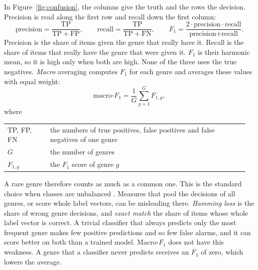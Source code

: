 In Figure~\ref{fig:confusion}, the columns give the truth and the rows the decision. Precision is read along the first row and recall down the first column:
\begin{equation}
  \text{precision} = \frac{\mathrm{TP}}{\mathrm{TP} + \mathrm{FP}}, \qquad
  \text{recall} = \frac{\mathrm{TP}}{\mathrm{TP} + \mathrm{FN}}, \qquad
  F_1 = \frac{2 \cdot \text{precision} \cdot \text{recall}}{\text{precision} + \text{recall}}.
\end{equation}
Precision is the share of items given the genre that really have it. Recall is the share of items that really have the genre that were given it. $F_1$ is their harmonic mean, so it is high only when both are high. None of the three uses the true negatives. \emph{Macro} averaging computes $F_1$ for each genre and averages these values with equal weight:
\begin{equation}
  \text{macro-}F_1 = \frac{1}{G} \sum_{g=1}^{G} F_{1,g},
\end{equation}
where

\smallskip
\noindent\begin{tabular}{@{}p{0.17\linewidth}p{0.79\linewidth}@{}}
  TP, FP, FN & the numbers of true positives, false positives and false negatives of one genre \\
  $G$ & the number of genres \\
  $F_{1,g}$ & the $F_1$ score of genre $g$ \\
\end{tabular}
\smallskip

\noindent A rare genre therefore counts as much as a common one. This is the standard choice when classes are unbalanced \citep{sokolova2009systematic}. Measures that pool the decisions of all genres, or score whole label vectors, can be misleading there. \emph{Hamming loss} is the share of wrong genre decisions, and \emph{exact match} the share of items whose whole label vector is correct. A trivial classifier that always predicts only the most frequent genre makes few positive predictions and so few false alarms, and it can score better on both than a trained model. Macro-$F_1$ does not have this weakness. A genre that a classifier never predicts receives an $F_1$ of zero, which lowers the average.

